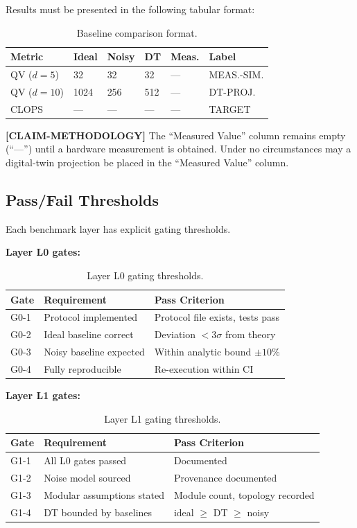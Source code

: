 \documentclass[conference]{IEEEtran}
\begin{document}
Results must be presented in the following tabular format:

\begin{table}[H]
\centering
\caption{Baseline comparison format.}
\label{tab:baseline_comparison}
\begin{tabular}{@{}l l l l l l@{}}
\toprule
\textbf{Metric} & \textbf{Ideal} & \textbf{Noisy} & \textbf{DT} & \textbf{Meas.} & \textbf{Label} \\
\midrule
QV ($d{=}5$) & 32 & 32 & 32 & --- & MEAS.-SIM. \\
QV ($d{=}10$) & 1024 & 256 & 512 & --- & DT-PROJ. \\
CLOPS & --- & --- & --- & --- & TARGET \\
\bottomrule
\end{tabular}
\end{table}

\textbf{[CLAIM-METHODOLOGY]} The ``Measured Value'' column remains empty (``---'') until a hardware measurement is obtained. Under no circumstances may a digital-twin projection be placed in the ``Measured Value'' column.

\subsection{Pass/Fail Thresholds}

Each benchmark layer has explicit gating thresholds.

\textbf{Layer L0 gates:}

\begin{table}[H]
\centering
\caption{Layer L0 gating thresholds.}
\begin{tabular}{@{}l L{3cm} L{3cm}@{}}
\toprule
\textbf{Gate} & \textbf{Requirement} & \textbf{Pass Criterion} \\
\midrule
G0-1 & Protocol implemented & Protocol file exists, tests pass \\
G0-2 & Ideal baseline correct & Deviation $< 3\sigma$ from theory \\
G0-3 & Noisy baseline expected & Within analytic bound $\pm 10\%$ \\
G0-4 & Fully reproducible & Re-execution within CI \\
\bottomrule
\end{tabular}
\end{table}

\textbf{Layer L1 gates:}

\begin{table}[H]
\centering
\caption{Layer L1 gating thresholds.}
\begin{tabular}{@{}l L{3cm} L{3cm}@{}}
\toprule
\textbf{Gate} & \textbf{Requirement} & \textbf{Pass Criterion} \\
\midrule
G1-1 & All L0 gates passed & Documented \\
G1-2 & Noise model sourced & Provenance documented \\
G1-3 & Modular assumptions stated & Module count, topology recorded \\
G1-4 & DT bounded by baselines & ideal $\geq$ DT $\geq$ noisy \\
\bottomrule
\end{tabular}
\end{table}
\end{document}
